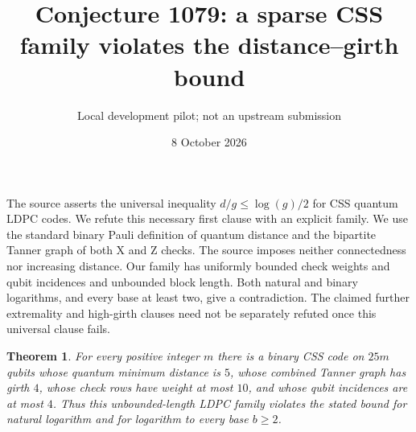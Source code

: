 \documentclass[11pt]{article}
\title{Conjecture 1079: a sparse CSS family violates the distance--girth bound}
\author{Local development pilot; not an upstream submission}
\date{8 October 2026}
\newtheorem{theorem}{Theorem}
\begin{document}
\maketitle
The source asserts the universal inequality $d/g\le\log(g)/2$ for CSS quantum
LDPC codes. We refute this necessary first clause with an explicit family.
We use the standard binary Pauli definition of quantum distance and the
bipartite Tanner graph of both X and Z checks. The source imposes neither
connectedness nor increasing distance. Our family has uniformly bounded
check weights and qubit incidences and unbounded block length. Both natural
and binary logarithms, and every base at least two, give a contradiction.
The claimed further extremality and high-girth clauses need not be separately
refuted once this universal clause fails.

\begin{theorem}
For every positive integer $m$ there is a binary CSS code on $25m$ qubits
whose quantum minimum distance is $5$, whose combined Tanner graph has girth
$4$, whose check rows have weight at most $10$, and whose qubit incidences
are at most $4$. Thus this unbounded-length LDPC family violates the stated
bound for natural logarithm and for logarithm to every base $b\ge2$.
\end{theorem}
\end{document}
